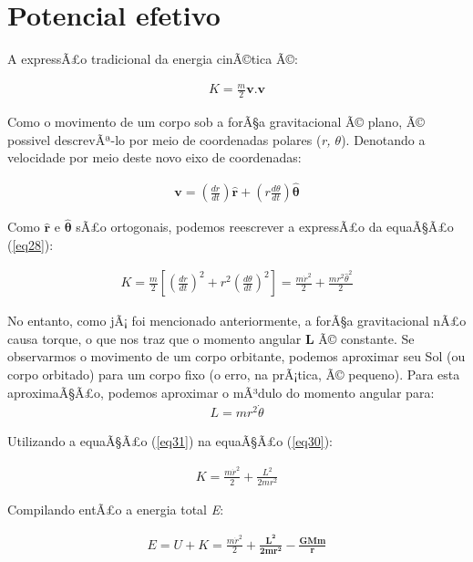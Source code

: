 \section{Potencial efetivo}

A expressÃ£o tradicional da energia cinÃ©tica Ã©:

\begin{eqnarray}
    K = \frac{m}{2}\mathbf{v.v} \label{eq28}
\end{eqnarray}

Como o movimento de um corpo sob a forÃ§a gravitacional Ã© plano, Ã© possivel descrevÃª-lo por meio de coordenadas polares (\textit{r, $\theta$}). Denotando a velocidade por meio deste novo eixo de coordenadas:

\begin{eqnarray}
   \mathbf{v} = \left(\frac{dr}{dt}\right)\mathbf{\hat{r}} + \left(r\frac{d\theta}{dt}\right)\mathbf{\hat{\theta}} \label{eq29}
\end{eqnarray}

Como $\mathbf{\hat{r}}$ e $\mathbf{\hat{\theta}}$ sÃ£o ortogonais, podemos reescrever a expressÃ£o da equaÃ§Ã£o (\ref{eq28}):

\begin{eqnarray}
    K = \frac{m}{2}\left[\left(\frac{dr}{dt}\right)^2 + r^2\left(\frac{d\theta}{dt}\right)^2\right] = \frac{m\dot{r}^2}{2} + \frac{mr^2\hat{\theta}^2}{2} \label{eq30}
\end{eqnarray}

No entanto, como jÃ¡ foi mencionado anteriormente, a forÃ§a gravitacional nÃ£o causa torque, o que nos traz que o momento angular \textbf{L} Ã© constante. Se observarmos o movimento de um corpo orbitante, podemos aproximar seu Sol (ou corpo orbitado) para um corpo fixo (o erro, na prÃ¡tica, Ã© pequeno). Para esta aproximaÃ§Ã£o, podemos aproximar o mÃ³dulo do momento angular para:
\begin{eqnarray}
    L = mr^2\dot{\theta} \label{eq31}
\end{eqnarray}

Utilizando a equaÃ§Ã£o (\ref{eq31}) na equaÃ§Ã£o (\ref{eq30}):

\begin{eqnarray}
    K = \frac{m\dot{r}^2}{2} + \frac{L^2}{2mr^2} \label{eq32}
\end{eqnarray}

Compilando entÃ£o a energia total \textit{E}:

\begin{eqnarray}
    E = U + K = \frac{m\dot{r}^2}{2} + \mathbf{\frac{L^2}{2mr^2} - \frac{GMm}{r}} \label{eq33}
\end{eqnarray}

